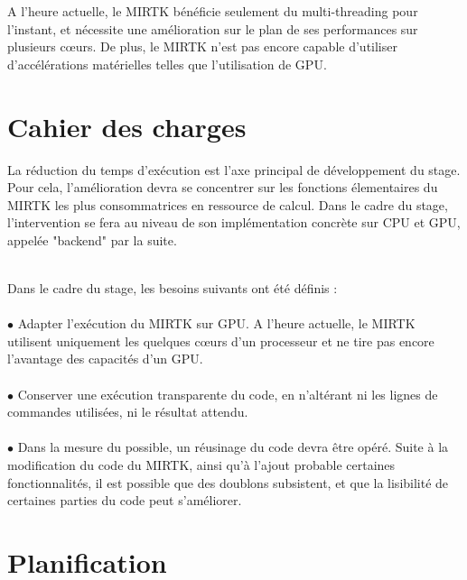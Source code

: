 \documentclass[10pt]{report}
\begin{document}
	A l'heure actuelle, le MIRTK bénéficie seulement du multi-threading pour l'instant, et nécessite une amélioration sur le plan de ses performances sur plusieurs cœurs. De plus,  le MIRTK n'est pas encore capable d'utiliser d'accélérations matérielles telles que l'utilisation de GPU.
	
	\section{Cahier des charges}
	La réduction du temps d'exécution est l'axe principal de développement du stage. Pour cela, l'amélioration devra se concentrer sur les fonctions élementaires du MIRTK les plus consommatrices en ressource de calcul. Dans le cadre du stage, l'intervention se fera au niveau de son implémentation concrète sur CPU et GPU, appelée "backend" par la suite.\\ ~\par
	
	\noindent Dans le cadre du stage, les besoins suivants ont été définis : \\
	\\{$\bullet$} Adapter l'exécution du MIRTK sur GPU. A l'heure actuelle, le MIRTK utilisent uniquement les quelques cœurs d'un processeur et ne tire pas encore l'avantage des capacités d'un GPU.\\
	\\{$\bullet$} Conserver une exécution transparente du code, en n'altérant ni les lignes de commandes utilisées, ni le résultat attendu.  \\
	\\{$\bullet$} Dans la mesure du possible, un réusinage du code devra être opéré. Suite à la modification du code du MIRTK, ainsi qu'à l'ajout probable certaines fonctionnalités, il est possible que des doublons subsistent, et que la lisibilité de certaines parties du code peut s'améliorer.	
	\section{Planification}
\end{document}
